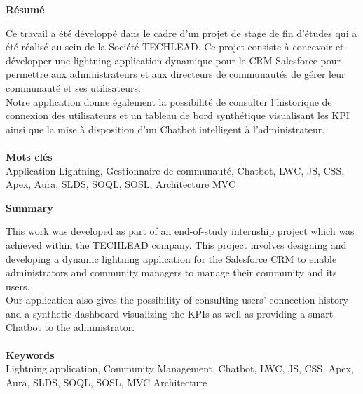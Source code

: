 
\thispagestyle{empty}
\vspace*{\fill}
\begingroup
\centering
\begin{center}
{\large \textbf{Résumé}}
\end{center}

Ce travail a été développé dans le cadre d'un projet de stage de fin d'études qui a été réalisé au sein de la
Société TECHLEAD.
Ce projet consiste à concevoir et développer une lightning application dynamique pour le CRM Salesforce
pour permettre aux administrateurs et aux directeurs de communautés de gérer leur communauté et ses utilisateurs.\\
Notre application donne également
la possibilité de consulter l'historique de connexion des utilisateurs et un tableau de bord synthétique visualisant les KPI ainsi que la mise à disposition d'un Chatbot intelligent à l'administrateur.\\~\\
\textbf{Mots clés}\\
Application Lightning, Gestionnaire de communauté, Chatbot, LWC, JS, CSS, Apex, Aura, SLDS, SOQL, SOSL, 
Architecture MVC

\endgroup
\vspace*{\fill}
\cleardoublepage%










\thispagestyle{empty}
\vspace*{\fill}
\begingroup
\centering
\begin{center}
{\large \textbf{Summary}}
\end{center}

This work was developed as part of an end-of-study internship project which was achieved within the
TECHLEAD company.
This project involves designing and developing a dynamic lightning application for the Salesforce CRM
to enable administrators and community managers to manage their community and its users.\\
Our application also gives
the possibility of consulting users' connection history and a synthetic dashboard visualizing the KPIs as well as providing a smart Chatbot to the administrator.\\~\\
\textbf{Keywords}\\
Lightning application, Community Management, Chatbot, LWC, JS, CSS, Apex, Aura, SLDS, SOQL, SOSL, 
MVC Architecture

\endgroup
\vspace*{\fill}




